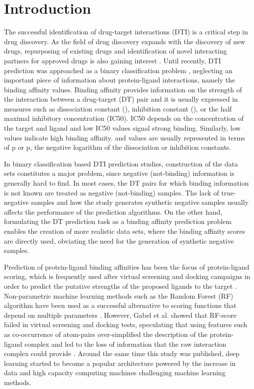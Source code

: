 \documentclass[11pt,letterpaper]{article}
\begin{document}
\section*{Introduction}

The successful identification of drug-target interactions (DTI) is a critical step in drug discovery. As the field of drug discovery expands with the discovery of new drugs, repurposing of existing drugs and identification of novel interacting partners for approved drugs is also gaining interest \cite{oprea2012drug}. Until recently, DTI prediction was approached as a binary classification problem \cite{yamanishi2008predict, bleakley2009, laarhoven2011, gonen2012predict, cao2014computational, cao2012large, cobanoglu2013predict, ozturk2016comparative}, neglecting an important piece of information about protein-ligand interactions, namely the binding affinity values. Binding affinity provides information on the strength of the interaction between a drug-target (DT) pair and it is usually expressed in measures such as dissociation constant (), inhibition constant (), or the half maximal inhibitory concentration (IC50). IC50 depends on the concentration of the target and ligand \cite{cer2009ic} and low IC50 values signal strong binding. 
Similarly, low  values indicate high binding affinity.  and  values are usually represented in terms of p or p, the negative logarithm of the dissociation or inhibition constants. 

In binary classification based DTI prediction studies, construction of the data sets constitutes a major problem, since negative (not-binding) information is generally hard to find. In most cases, the DT pairs for which binding information is not known are treated as negative (not-binding) samples.  The lack of true-negative samples and how the study generates synthetic negative samples usually affects the performance of the prediction algorithms. On the other hand, formulating the DT prediction task as a binding affinity prediction problem enables the creation of more realistic data sets, where the binding affinity scores are directly used, obviating the need for the generation of synthetic negative samples. 

Prediction of protein-ligand  binding affinities has been the focus of protein-ligand scoring, which is frequently used after virtual screening and docking campaigns in order to predict the putative strengths of the proposed ligands to the target \cite{ragoza2017protein}. Non-parametric machine learning methods such as the Random Forest (RF) algorithm have been used as a successful alternative to scoring functions that depend on multiple parameters  \cite{ballester2010machine,li2015low,shar2016pred}. However, Gabel et al. showed that RF-score failed in virtual screening and docking tests, speculating that using features such as co-occurrence of atom-pairs over-simplified the description of the protein-ligand complex and led to the loss of information that the raw interaction complex could provide \cite{gabel2014beware}. Around the same time this study was published, deep learning started to become a popular architecture powered by the increase in data and high capacity computing machines challenging machine learning methods. 
\end{document}
